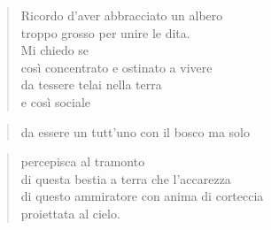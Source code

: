 
\begin{verse}
    Ricordo d'aver abbracciato un albero\\
    troppo grosso per unire le dita.\\
    Mi chiedo se\\
    così concentrato e ostinato a vivere\\
    da tessere telai nella terra\\
    e così sociale\\
\end{verse}
\vspace{-0.9cm}
    \begin{verse}da essere un tutt'uno con il bosco \hfill ma solo\end{verse}
\vspace{-0.9cm}
\begin{verse}
    percepisca al tramonto\\
    di questa bestia a terra che l'accarezza\\
    di questo ammiratore con anima di corteccia\\
    proiettata al cielo.

\end{verse}